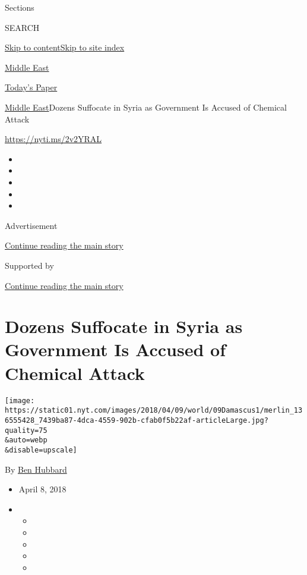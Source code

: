 Sections

SEARCH

\protect\hyperlink{site-content}{Skip to
content}\protect\hyperlink{site-index}{Skip to site index}

\href{https://www.nytimes.com/section/world/middleeast}{Middle East}

\href{https://myaccount.nytimes.com/auth/login?response_type=cookie\&client_id=vi}{}

\href{https://www.nytimes.com/section/todayspaper}{Today's Paper}

\href{/section/world/middleeast}{Middle East}\textbar{}Dozens Suffocate
in Syria as Government Is Accused of Chemical Attack

\href{https://nyti.ms/2v2YRAL}{https://nyti.ms/2v2YRAL}

\begin{itemize}
\item
\item
\item
\item
\item
\end{itemize}

Advertisement

\protect\hyperlink{after-top}{Continue reading the main story}

Supported by

\protect\hyperlink{after-sponsor}{Continue reading the main story}

\hypertarget{dozens-suffocate-in-syria-as-government-is-accused-of-chemical-attack}{%
\section{Dozens Suffocate in Syria as Government Is Accused of Chemical
Attack}\label{dozens-suffocate-in-syria-as-government-is-accused-of-chemical-attack}}

\texttt{[image: https://static01.nyt.com/images/2018/04/09/world/09Damascus1/merlin\_136555428\_7439ba87-4dca-4559-902b-cfab0f5b22af-articleLarge.jpg?quality=75\\\&auto=webp\\\&disable=upscale]}

By \href{https://www.nytimes.com/by/ben-hubbard}{Ben Hubbard}

\begin{itemize}
\item
  April 8, 2018
\item
  \begin{itemize}
  \item
  \item
  \item
  \item
  \item
  \end{itemize}
\end{itemize}

